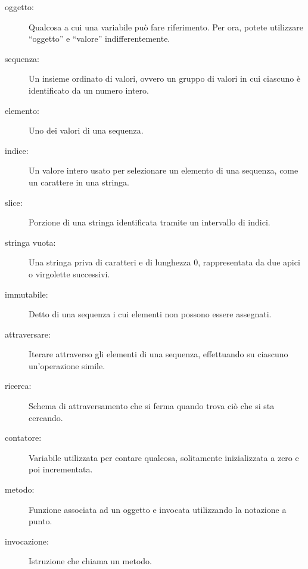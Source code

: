 \documentclass[10pt]{book}
\begin{document}
\begin{description}

\item[oggetto:] Qualcosa a cui una variabile può fare riferimento. Per ora, potete utilizzare ``oggetto'' e ``valore'' indifferentemente.

\item[sequenza:] Un insieme ordinato di valori, ovvero un gruppo di valori in cui ciascuno è identificato da un numero intero.

\item[elemento:] Uno dei valori di una sequenza.

\item[indice:] Un valore intero usato per selezionare un elemento di una sequenza, come un carattere in una stringa.

\item[slice:] Porzione di una stringa identificata tramite un intervallo di indici.

\item[stringa vuota:] Una stringa priva di caratteri e di lunghezza 0, rappresentata da due apici o virgolette successivi.

\item[immutabile:] Detto di una sequenza i cui elementi non possono essere assegnati.

\item[attraversare:] Iterare attraverso gli elementi di una sequenza, effettuando su ciascuno un'operazione simile.

\item[ricerca:] Schema di attraversamento che si ferma quando trova ciò che si sta cercando.

\item[contatore:] Variabile utilizzata per contare qualcosa, solitamente inizializzata a zero e poi incrementata.

\item[metodo:] Funzione associata ad un oggetto e invocata utilizzando la notazione a punto.

\item[invocazione:] Istruzione che chiama un metodo.

\end{description}
\end{document}
